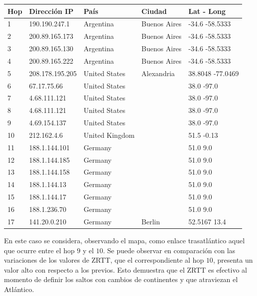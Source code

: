 \begin{center}
 \begin{tabular}{|l|l|l|l|l|}
    \hline
    Hop &Dirección IP &País &Ciudad &Lat - Long \\ \hline \hline
    1 & 190.190.247.1 & Argentina & Buenos Aires & -34.6 -58.5333	\\ \hline
    2 & 200.89.165.173 & Argentina & Buenos Aires & -34.6 -58.5333	\\ \hline
    3 & 200.89.165.130 & Argentina & Buenos Aires & -34.6 -58.5333	\\ \hline
    4 & 200.89.165.222 & Argentina & Buenos Aires & -34.6 -58.5333	\\ \hline
    5 & 208.178.195.205 & United States & Alexandria & 38.8048 -77.0469 \\ \hline
    6 & 67.17.75.66 & United States &  & 38.0 -97.0 \\ \hline
    7 & 4.68.111.121 & United States & & 38.0 -97.0 \\ \hline
    8 & 4.68.111.121 & United States & & 38.0 -97.0 \\ \hline
    9 & 4.69.154.137 & United States & & 38.0 -97.0 \\ \hline
    10 & 212.162.4.6 & United Kingdom & &  51.5 -0.13 \\ \hline
    11 & 188.1.144.101 & Germany &  & 51.0 9.0 \\ \hline
    12 & 188.1.144.185 & Germany &  & 51.0 9.0 \\ \hline
    13 & 188.1.144.158 & Germany &  & 51.0 9.0 \\ \hline
    14 & 188.1.144.13 & Germany &  & 51.0 9.0 \\ \hline
    15 & 188.1.144.17 & Germany &  & 51.0 9.0 \\ \hline
    16 & 188.1.236.70 & Germany &  & 51.0 9.0 \\ \hline
    17 & 141.20.0.210 & Germany & Berlin & 52.5167 13.4 \\ \hline
 \end{tabular}
\end{center}

En este caso se considera, observando el mapa, como enlace trasatlántico aquel que ocurre entre el hop $9$ y el $10$. Se puede observar en comparación con las variaciones de los valores de ZRTT, que el correspondiente al hop $10$, presenta un valor alto con respecto a los previos. Esto demuestra que el ZRTT es efectivo al momento de definir los saltos con cambios de continentes y que atraviezan el Atlántico.

